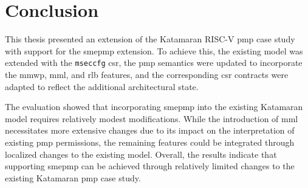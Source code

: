 \glsresetall

\chapter{Conclusion}




This thesis presented an extension of the Katamaran RISC-V \gls{pmp} case study with support for the \gls{smepmp} extension.
To achieve this, the existing model was extended with the \texttt{mseccfg} \gls{csr}, the \gls{pmp} semantics were updated to incorporate the \gls{mmwp}, \gls{mml}, and \gls{rlb} features, and the corresponding \gls{csr} contracts were adapted to reflect the additional architectural state.

The evaluation showed that incorporating \gls{smepmp} into the existing Katamaran model requires relatively modest modifications.
While the introduction of \gls{mml} necessitates more extensive changes due to its impact on the interpretation of existing \gls{pmp} permissions, the remaining features could be integrated through localized changes to the existing model.
Overall, the results indicate that supporting \gls{smepmp} can be achieved through relatively limited changes to the existing Katamaran \gls{pmp} case study.

